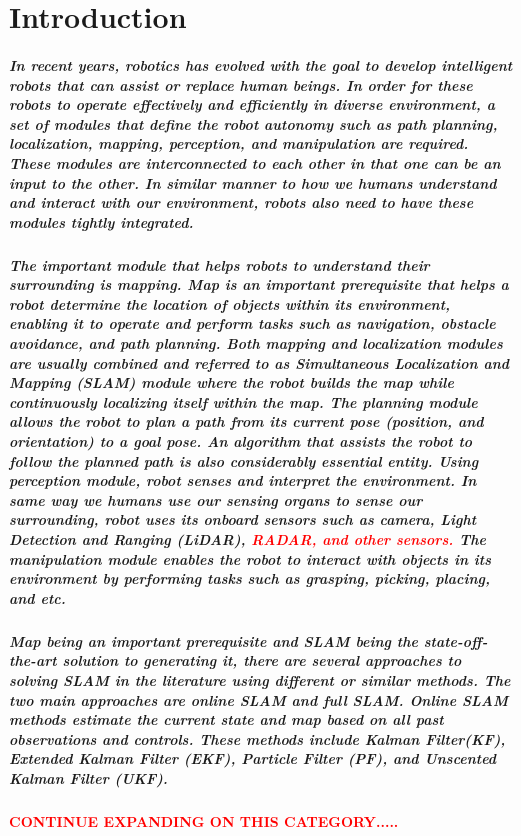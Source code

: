 \chapter{Introduction}
\label{ch:intro}

\paragraph{\textnormal{In recent years, robotics has evolved with the goal to develop intelligent robots that can assist or replace human beings. In order for these robots to operate effectively and efficiently  in diverse environment, a set of modules that define the robot autonomy such as path planning, localization, mapping, perception, and manipulation are required. These modules are interconnected to each other in that one can be an input to the other. In similar manner to how we humans understand and interact with our environment, robots also need to have these modules tightly integrated.}}

\paragraph{\textnormal{The important module that helps robots to understand their surrounding is mapping. Map is an important prerequisite that helps a robot determine the location of objects within its environment, enabling it to operate and perform tasks such as navigation, obstacle avoidance, and path planning. Both mapping and localization modules are usually combined and referred to as Simultaneous Localization and Mapping (SLAM) module where the robot builds the map while continuously localizing itself within the map.  The planning module allows the robot to plan a path from its current pose (position, and orientation) to a  goal pose. An algorithm that assists the robot to follow the planned path is also considerably essential entity. Using perception module, robot senses and interpret the environment. In same way we humans use our sensing organs to sense our surrounding, robot uses its onboard sensors such as camera, Light Detection and Ranging (LiDAR), \textcolor{red}{ RADAR, and other sensors.} The manipulation module enables the robot to interact with objects in its environment by performing tasks such as grasping, picking, placing, and etc.}}

\paragraph{\textnormal{Map being an important prerequisite and SLAM being the state-off-the-art solution to generating it, there are several approaches to solving SLAM in the literature using different or similar methods. The two main approaches are online SLAM and full SLAM.  Online SLAM methods estimate the current state and  map based on all past observations and controls. These methods include Kalman Filter(KF), Extended Kalman Filter (EKF), Particle Filter (PF), and Unscented Kalman Filter (UKF)\cite{huang2008analysis}.}} 
\textbf{\textcolor{red}{CONTINUE EXPANDING ON THIS CATEGORY.....}}

